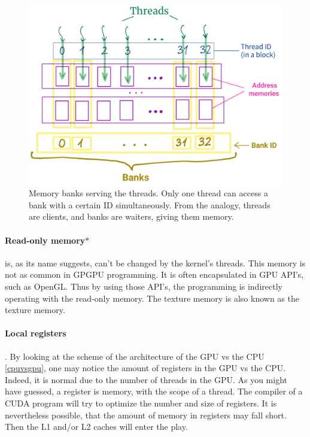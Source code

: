 \documentclass[12pt]{article}
\begin{document}
\begin{figure}[H]
   \centering
   \includegraphics[scale=0.18]{banks1.png}
   \caption{Memory banks serving the threads. Only one thread can access a bank with a certain ID simultaneously. 
   From the analogy, threads are clients, and banks are waiters, giving them memory.}
   \label{banks}

\end{figure}

\vspace{-0.5cm}
\paragraph{Read-only memory$\ast$} is, as its name suggests, can't be changed by the kernel's threads. This memory is not as common 
in GPGPU programming. It is often encapsulated in GPU API's, such as OpenGL. Thus by using those API's, the programming is indirectly 
operating with the read-only memory. The texture memory is also known as the texture memory.

\paragraph{Local registers}. By looking at the scheme of the architecture of the GPU vs the CPU \autoref{cpuvsgpu}, one may notice the amount 
of registers in the GPU vs the CPU. Indeed, it is normal due to the number of threads in the GPU. As you might have guessed, a 
register is memory, with the scope of a thread. The compiler of a CUDA program will try to optimize the number and size of registers. 
It is nevertheless possible, that the amount of memory in registers may fall short. Then the L1 and/or L2 caches will enter the 
play.
\end{document}

